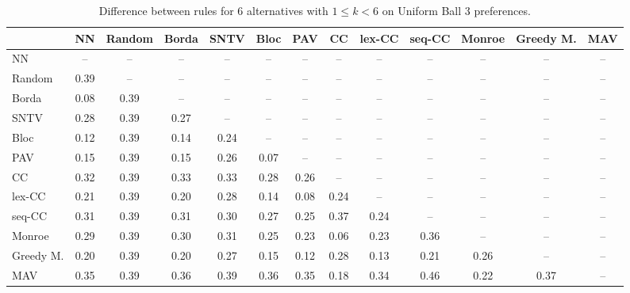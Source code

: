 
\begin{table*}[h!]
\centering
\begin{tabular}{lcccccccccccc}
\toprule
 & NN & Random & Borda & SNTV & Bloc & PAV & CC & lex-CC & seq-CC & Monroe & Greedy M. & MAV \\
\midrule
NN & -- & -- & -- & -- & -- & -- & -- & -- & -- & -- & -- & -- \\
Random & 0.39 & -- & -- & -- & -- & -- & -- & -- & -- & -- & -- & -- \\
Borda & 0.08 & 0.39 & -- & -- & -- & -- & -- & -- & -- & -- & -- & -- \\
SNTV & 0.28 & 0.39 & 0.27 & -- & -- & -- & -- & -- & -- & -- & -- & -- \\
Bloc & 0.12 & 0.39 & 0.14 & 0.24 & -- & -- & -- & -- & -- & -- & -- & -- \\
PAV & 0.15 & 0.39 & 0.15 & 0.26 & 0.07 & -- & -- & -- & -- & -- & -- & -- \\
CC & 0.32 & 0.39 & 0.33 & 0.33 & 0.28 & 0.26 & -- & -- & -- & -- & -- & -- \\
lex-CC & 0.21 & 0.39 & 0.20 & 0.28 & 0.14 & 0.08 & 0.24 & -- & -- & -- & -- & -- \\
seq-CC & 0.31 & 0.39 & 0.31 & 0.30 & 0.27 & 0.25 & 0.37 & 0.24 & -- & -- & -- & -- \\
Monroe & 0.29 & 0.39 & 0.30 & 0.31 & 0.25 & 0.23 & 0.06 & 0.23 & 0.36 & -- & -- & -- \\
Greedy M. & 0.20 & 0.39 & 0.20 & 0.27 & 0.15 & 0.12 & 0.28 & 0.13 & 0.21 & 0.26 & -- & -- \\
MAV & 0.35 & 0.39 & 0.36 & 0.39 & 0.36 & 0.35 & 0.18 & 0.34 & 0.46 & 0.22 & 0.37 & -- \\
\bottomrule
\end{tabular}

\caption{Difference between rules for 6 alternatives with $1 \leq k < 6$ on Uniform Ball 3 preferences.}
\end{table*}
